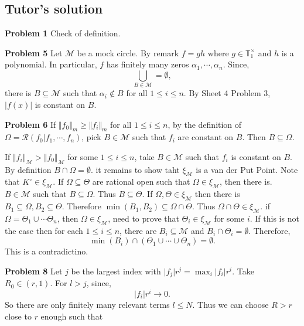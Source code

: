 \documentclass[10pt]{article}
\newcommand{\norm}[1]{\Vert #1 \Vert}
\newcommand{\T}[0]{\mathbb{T}}
\newcommand{\ab}[1]{\vert #1 \vert}
\begin{document}
\subsection{Tutor's solution}
\par\textbf{Problem 1}
Check of definition.
\par\textbf{Problem 5}
Let $\mathcal{M}$ be a mock circle. By remark $f=gh$ where $g\in \T_1^\times$ and $h$ is a polynomial. In particular, $f$ has finitely many zeros $\alpha_1,\cdots,\alpha_n$. Since,
\begin{equation*}
    \bigcup_{B\in\mathcal{M}}=\emptyset,
\end{equation*}
there is $B\subseteq\mathcal{M}$ such that $\alpha_i\not\in B$ for all $1\leq i\leq n$. By Sheet 4 Problem 3, $\ab{f(x)}$ is constant on $B$.
\par\textbf{Problem 6}
If $\norm{f_0}_m\geq\norm{f_i}_m$ for all $1\leq i\leq n$, by the definition of $\Omega = \mathcal{R}(f_0|f_1,\cdots,f_n)$, pick $B\in\mathcal{M}$ such that $f_i$ are constant on $B$. Then $B\subseteq \Omega$.
\par If $\norm{f_i}_\mathcal{M}>\norm{f_0}_{\mathcal{M}}$ for some $1\leq i\leq n$, take $B\in\mathcal{M}$ such that $f_i$ is constant on $B$. By definition $B\cap \Omega=\emptyset$. it remains to show taht $\xi_\mathcal{M}$ is a van der Put Point. Note that $K^\circ\in\xi_\mathcal{M}$. If $\Omega\subseteq\Theta$ are  rational open such that $\Omega\in\xi_\mathcal{M}$, then there is. $B\in\mathcal{M}$ such that $B\subseteq\Omega$. Thus $B\subseteq\Theta$.
If $\Omega,\Theta\in\xi_\mathcal{M}$ then there is $B_1\subseteq\Omega,B_2\subseteq\Theta$. Therefore $\min(B_1,B_2)\subseteq\Omega\cap\Theta$. Thus $\Omega\cap\Theta\in\xi_{\mathcal{M}}$. if $\Omega = \Theta_1\cup\cdots\Theta_n$, then $\Omega\in\xi_\mathcal{M}$, need to prove that $\Theta_i\in\xi_\mathcal{M}$ for some $i$.
If this is not the case then for each $1\leq i\leq n$, there are $B_i\subseteq\mathcal{M}$ and $B_i\cap\Theta_i=\emptyset$. Therefore,
\begin{equation*}
    \min(B_i)\cap(\Theta_1\cup\cdots\cup\Theta_n)=\emptyset.
\end{equation*}
This is a contradictino.
\par\textbf{Problem 8}
Let $j$ be the largest index with $\vert f_j\vert r^j = \max_{i}\vert f_i\vert r^i.$ Take $R_0\in(r,1)$. For $l>j$, since,
\begin{equation*}
    \ab{f_i}r^i \to 0.
\end{equation*}
So there are only finitely many relevant terms $l\leq N$. Thus we can choose $R>r$ close to $r$ enough such that 
\end{document}
